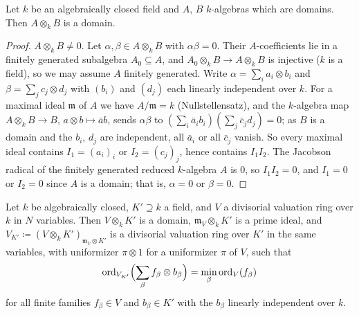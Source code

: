 \begin{lemma}\label{lem:c0-tensor-domain}
\leanok
Let $k$ be an algebraically closed field and $A$, $B$ $k$-algebras which are domains. Then $A\otimes_kB$ is a domain.
\end{lemma}

\begin{proof}
$A\otimes_kB\ne0$. Let $\alpha,\beta\in A\otimes_kB$ with $\alpha\beta=0$. Their $A$-coefficients lie in a finitely generated
subalgebra $A_0\subseteq A$, and $A_0\otimes_kB\to A\otimes_kB$ is injective ($k$ is a field), so we may assume $A$ finitely
generated. Write $\alpha=\sum_ia_i\otimes b_i$ and $\beta=\sum_jc_j\otimes d_j$ with $(b_i)$ and $(d_j)$ each linearly independent
over $k$. For a maximal ideal $\mathfrak m$ of $A$ we have $A/\mathfrak m=k$ (Nullstellensatz), and the $k$-algebra map
$A\otimes_kB\to B$, $a\otimes b\mapsto\bar ab$, sends $\alpha\beta$ to $(\sum_i\bar a_ib_i)(\sum_j\bar c_jd_j)=0$; as $B$ is a domain
and the $b_i$, $d_j$ are independent, all $\bar a_i$ or all $\bar c_j$ vanish. So every maximal ideal contains
$I_1=(a_i)_i$ or $I_2=(c_j)_j$, hence contains $I_1I_2$. The Jacobson radical of the finitely generated reduced
$k$-algebra $A$ is $0$, so $I_1I_2=0$, and $I_1=0$ or $I_2=0$ since $A$ is a domain; that is, $\alpha=0$ or $\beta=0$.
\end{proof}

\begin{lemma}\label{lem:c0-base-change-dvr}
\leanok
{}
Let $k$ be algebraically closed, $K'\supseteq k$ a field, and $V$ a divisorial valuation ring over $k$ in $N$ variables.
Then $V\otimes_kK'$ is a domain, $\mathfrak m_V\otimes_kK'$ is a prime ideal, and
$V_{K'}\coloneqq(V\otimes_kK')_{\mathfrak m_V\otimes K'}$ is a divisorial valuation ring over $K'$ in the same variables, with
uniformizer $\pi\otimes1$ for a uniformizer $\pi$ of $V$, such that
\[
\operatorname{ord}_{V_{K'}}\Bigl(\sum_\beta f_\beta\otimes b_\beta\Bigr)=\min_\beta\operatorname{ord}_V(f_\beta)
\]
for all finite families $f_\beta\in V$ and $b_\beta\in K'$ with the $b_\beta$ linearly independent over $k$.
\end{lemma}

